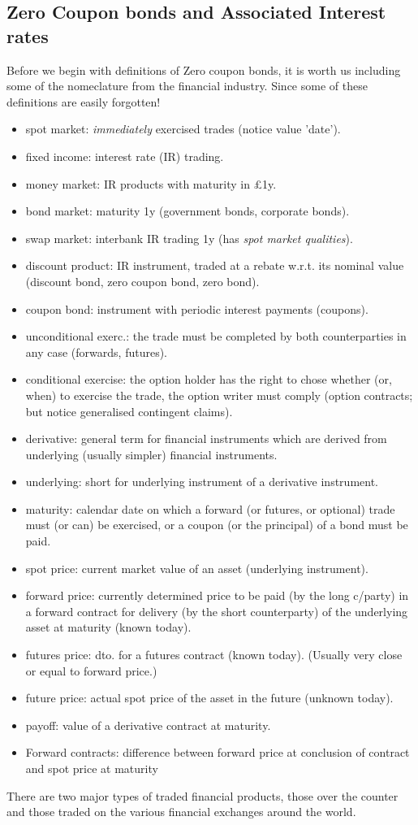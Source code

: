 \subsection{Zero Coupon bonds and Associated Interest rates} 
Before we begin with definitions of Zero coupon bonds, it is worth us including some of the nomeclature from the
financial industry. Since some of these definitions are easily forgotten!
\begin{dfn}
\begin{itemize}
 \item spot market: \textit{immediately} exercised trades (notice value 'date').
 \item fixed income: interest rate (IR) trading.
 \item money market: IR products with maturity in \pounds \;1y.
 \item bond market: maturity \gt 1y (government bonds, corporate bonds).
\item swap market: interbank IR trading \gt 1y (has \textit{spot market qualities}).
\item  discount product: IR instrument, traded at a rebate w.r.t. its nominal
value (discount bond, zero coupon bond, zero bond).
\item  coupon bond: instrument with periodic interest payments (coupons).
\item unconditional exerc.: the trade must be completed by both counterparties
in any case (forwards, futures).
\item conditional exercise: the option holder has the right to chose whether (or,
when) to exercise the trade, the option writer must
comply (option contracts; but notice generalised
contingent claims).
\item derivative: general term for financial instruments which are derived from
underlying (usually simpler) financial instruments.
\item underlying: short for underlying instrument of a derivative instrument.
\item maturity: calendar date on which a forward (or futures, or optional)
trade must (or can) be exercised, or a coupon (or the
principal) of a bond must be paid.
\item spot price: current market value of an asset (underlying instrument).
\item forward price: currently determined price to be paid (by the long c/party) in
a forward contract for delivery (by the short counterparty) of
the underlying asset at maturity (known today).
\item futures price: dto. for a futures contract (known today).
(Usually very close or equal to forward price.)
\item future price: actual spot price of the asset in the future (unknown today).
\item  payoff: value of a derivative contract at maturity.
\item  Forward contracts: difference between forward price at conclusion of
contract and spot price at maturity
\end{itemize}
There are two major types of traded financial products, those over the counter and those 
traded on the various financial exchanges around the world. 


\end{dfn}
